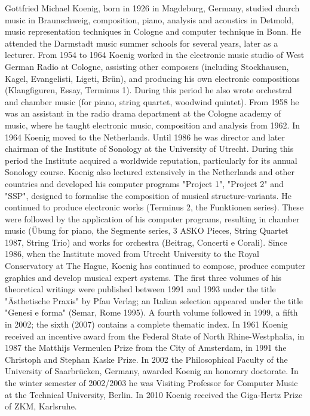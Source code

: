 \documentclass[a4paper,11pt]{article}
\begin{document}
Gottfried Michael Koenig, born in 1926 in Magdeburg, Germany, studied church music in Braunschweig, composition, piano, analysis and acoustics in Detmold, music representation techniques in Cologne and computer technique in Bonn.
He attended the Darmstadt music summer schools for several years, later as a lecturer.
From 1954 to 1964 Koenig worked in the electronic music studio of West German Radio at Cologne, assisting other composers (including Stockhausen, Kagel, Evangelisti, Ligeti, Brün), and producing his own electronic compositions (Klangfiguren, Essay, Terminus 1).
During this period he also wrote orchestral and chamber music (for piano, string quartet, woodwind quintet).
From 1958 he was an assistant in the radio drama department at the Cologne academy of music, where he taught electronic music, composition and analysis from 1962.
In 1964 Koenig moved to the Netherlands.
Until 1986 he was director and later chairman of the Institute of Sonology at the University of Utrecht.
During this period the Institute acquired a worldwide reputation, particularly for its annual Sonology course.
Koenig also lectured extensively in the Netherlands and other countries and developed his computer programs "Project 1", "Project 2" and "SSP", designed to formalise the composition of musical structure-variants.
He continued to produce electronic works (Terminus 2, the Funktionen series).
These were followed by the application of his computer programs, resulting in chamber music (Übung for piano, the Segmente series, 3 ASKO Pieces, String Quartet 1987, String Trio) and works for orchestra (Beitrag, Concerti e Corali).
Since 1986, when the Institute moved from Utrecht University to the Royal Conservatory at The Hague, Koenig has continued to compose, produce computer graphics and develop musical expert systems.
The first three volumes of his theoretical writings were published between 1991 and 1993 under the title "Ästhetische Praxis" by Pfau Verlag; an Italian selection appeared under the title "Genesi e forma" (Semar, Rome 1995).
A fourth volume followed in 1999, a fifth in 2002; the sixth (2007) contains a complete thematic index.
In 1961 Koenig received an incentive award from the Federal State of North Rhine-Westphalia, in 1987 the Matthijs Vermeulen Prize from the City of Amsterdam, in 1991 the Christoph and Stephan Kaske Prize.
In 2002 the Philosophical Faculty of the University of Saarbrücken, Germany, awarded Koenig an honorary doctorate.
In the winter semester of 2002/2003 he was Visiting Professor for Computer Music at the Technical University, Berlin.
In 2010 Koenig received the Giga-Hertz Prize of ZKM, Karlsruhe.
\end{document}
